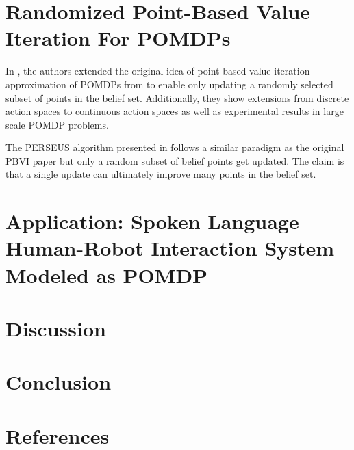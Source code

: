 \documentclass[12pt]{elsarticle}
\begin{document}
\section{Randomized Point-Based Value Iteration For POMDPs}
In \cite{spaan2005perseus}, the authors extended the original idea of point-based value iteration approximation of POMDPs from \cite{pineau2003point} to enable only updating a randomly selected subset of points in the belief set. Additionally, they show extensions from discrete action spaces to continuous action spaces as well as experimental results in large scale POMDP problems. 

The PERSEUS algorithm presented in \cite{spaan2005perseus} follows a similar paradigm as the original PBVI paper but only a random subset of belief points get updated. The claim is that a single update can ultimately improve many points in the belief set. 

\section{Application: Spoken Language Human-Robot Interaction System Modeled as POMDP}
\cite{doshi2008spoken}

\section{Discussion}


\section{Conclusion}



\pagebreak
\section*{References}

 
\end{document}
